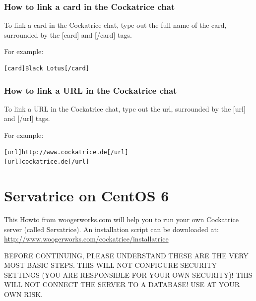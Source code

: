 \documentclass[a4paper]{scrbook}
\begin{document}
\subsection{How to link a card in the Cockatrice chat}
To link a card in the Cockatrice chat, type out the full name of the card, surrounded by the [card] and [/card] tags.

For example:
\begin{verbatim}
[card]Black Lotus[/card]
\end{verbatim}

\subsection{How to link a URL in the Cockatrice chat}
To link a URL in the Cockatrice chat, type out the url, surrounded by the [url] and [/url] tags.

For example:
\begin{verbatim}
[url]http://www.cockatrice.de[/url]
[url]cockatrice.de[/url]
\end{verbatim}


\chapter{Servatrice on CentOS 6}
\label{servatrice}
This Howto from woogerworks.com will help you to run your own Cockatrice server (called Servatrice).
An installation script can be downloaded at: \url{http://www.woogerworks.com/cockatrice/installatrice}

BEFORE CONTINUING, PLEASE UNDERSTAND THESE ARE THE VERY MOST BASIC STEPS.
THIS WILL NOT CONFIGURE SECURITY SETTINGS (YOU ARE RESPONSIBLE FOR YOUR OWN SECURITY)!
THIS WILL NOT CONNECT THE SERVER TO A DATABASE!
USE AT YOUR OWN RISK.
\end{document}
